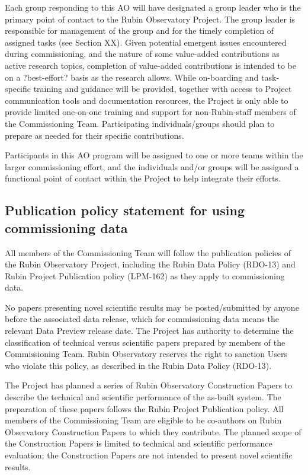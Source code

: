 \documentclass[SE,authoryear,toc]{lsstdoc}
\begin{document}
Each group responding to this AO will have designated a group leader who is the primary point of contact to the Rubin Observatory Project. The group leader is responsible for management of the group and for the timely completion of assigned tasks (see Section XX). Given potential emergent issues encountered during commissioning, and the nature of some value-added contributions as active research topics, completion of value-added contributions is intended to be on a ?best-effort? basis as the research allows. While on-boarding and task-specific training and guidance will be provided, together with access to Project communication tools and documentation resources, the Project is only able to provide limited one-on-one training and support for non-Rubin-staff members of the Commissioning Team. Participating individuals/groups should plan to prepare as needed for their specific contributions.

Participants in this AO program will be assigned to one or more teams within the larger commissioning effort, and the individuals and/or groups will be assigned a functional point of contact within the Project to help integrate their efforts.

\subsection{Publication policy statement for using commissioning data}

All members of the Commissioning Team will follow the publication policies of the Rubin Observatory Project, including the Rubin Data Policy (RDO-13) and Rubin Project Publication policy (LPM-162) as they apply to commissioning data.

No papers presenting novel scientific results may be posted/submitted by anyone before the associated data release, which for commissioning data means the relevant Data Preview release date. The Project has authority to determine the classification of technical versus scientific papers prepared by members of the Commissioning Team. Rubin Observatory reserves the right to sanction Users who violate this policy, as described in the Rubin Data Policy (RDO-13). 

The Project has planned a series of Rubin Observatory Construction Papers to describe the technical and scientific performance of the as-built system. The preparation of these papers follows the Rubin Project Publication policy. All members of the Commissioning Team are eligible to be co-authors on Rubin Observatory Construction Papers to which they contribute. The planned scope of the Construction Papers is limited to technical and scientific performance evaluation; the Construction Papers are not intended to present novel scientific results.
\end{document}
